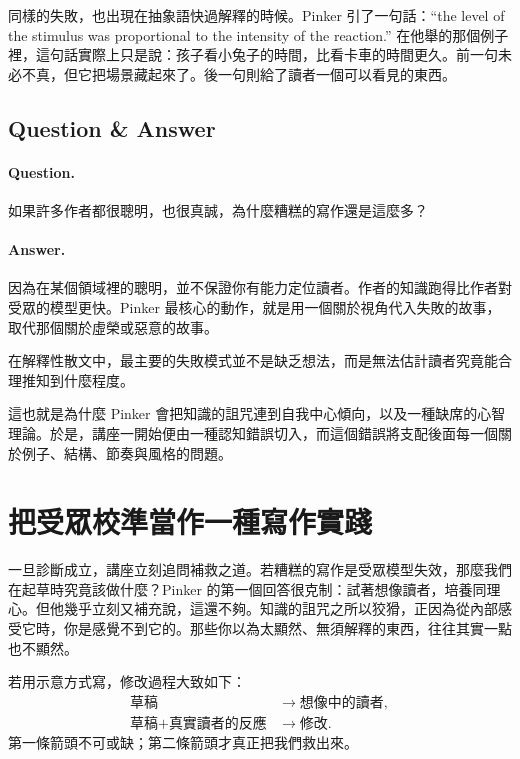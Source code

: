 同樣的失敗，也出現在抽象語快過解釋的時候。Pinker 引了一句話：``the level of the stimulus was proportional to the intensity of the reaction.'' 在他舉的那個例子裡，這句話實際上只是說：孩子看小兔子的時間，比看卡車的時間更久。前一句未必不真，但它把場景藏起來了。後一句則給了讀者一個可以看見的東西。

\subsection{Question \& Answer}

\paragraph{Question.} 如果許多作者都很聰明，也很真誠，為什麼糟糕的寫作還是這麼多？

\paragraph{Answer.} 因為在某個領域裡的聰明，並不保證你有能力定位讀者。作者的知識跑得比作者對受眾的模型更快。Pinker 最核心的動作，就是用一個關於視角代入失敗的故事，取代那個關於虛榮或惡意的故事。

\begin{proposition}
在解釋性散文中，最主要的失敗模式並不是缺乏想法，而是無法估計讀者究竟能合理推知到什麼程度。
\end{proposition}

這也就是為什麼 Pinker 會把知識的詛咒連到自我中心傾向，以及一種缺席的心智理論。於是，講座一開始便由一種認知錯誤切入，而這個錯誤將支配後面每一個關於例子、結構、節奏與風格的問題。

\section{把受眾校準當作一種寫作實踐}

一旦診斷成立，講座立刻追問補救之道。若糟糕的寫作是受眾模型失效，那麼我們在起草時究竟該做什麼？Pinker 的第一個回答很克制：試著想像讀者，培養同理心。但他幾乎立刻又補充說，這還不夠。知識的詛咒之所以狡猾，正因為從內部感受它時，你是感覺不到它的。那些你以為太顯然、無須解釋的東西，往往其實一點也不顯然。

若用示意方式寫，修改過程大致如下：
\begin{align}
\text{草稿} &\to \text{想像中的讀者}, \\
\text{草稿} + \text{真實讀者的反應} &\to \text{修改}.
\end{align}
第一條箭頭不可或缺；第二條箭頭才真正把我們救出來。

